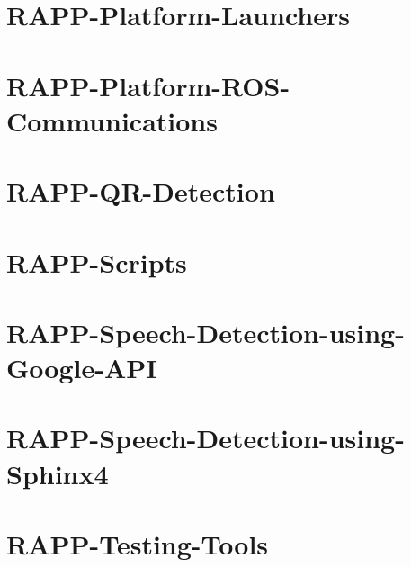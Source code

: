 \documentclass[twoside]{book}
\begin{document}
\chapter{R\-A\-P\-P-\/\-Platform-\/\-Launchers}
\label{md_rapp-platform_8wiki_RAPP-Platform-Launchers}
\hypertarget{md_rapp-platform_8wiki_RAPP-Platform-Launchers}{}

\chapter{R\-A\-P\-P-\/\-Platform-\/\-R\-O\-S-\/\-Communications}
\label{md_rapp-platform_8wiki_RAPP-Platform-ROS-Communications}
\hypertarget{md_rapp-platform_8wiki_RAPP-Platform-ROS-Communications}{}

\chapter{R\-A\-P\-P-\/\-Q\-R-\/\-Detection}
\label{md_rapp-platform_8wiki_RAPP-QR-Detection}
\hypertarget{md_rapp-platform_8wiki_RAPP-QR-Detection}{}

\chapter{R\-A\-P\-P-\/\-Scripts}
\label{md_rapp-platform_8wiki_RAPP-Scripts}
\hypertarget{md_rapp-platform_8wiki_RAPP-Scripts}{}

\chapter{R\-A\-P\-P-\/\-Speech-\/\-Detection-\/using-\/\-Google-\/\-A\-P\-I}
\label{md_rapp-platform_8wiki_RAPP-Speech-Detection-using-Google-API}
\hypertarget{md_rapp-platform_8wiki_RAPP-Speech-Detection-using-Google-API}{}

\chapter{R\-A\-P\-P-\/\-Speech-\/\-Detection-\/using-\/\-Sphinx4}
\label{md_rapp-platform_8wiki_RAPP-Speech-Detection-using-Sphinx4}
\hypertarget{md_rapp-platform_8wiki_RAPP-Speech-Detection-using-Sphinx4}{}

\chapter{R\-A\-P\-P-\/\-Testing-\/\-Tools}
\label{md_rapp-platform_8wiki_RAPP-Testing-Tools}
\hypertarget{md_rapp-platform_8wiki_RAPP-Testing-Tools}{}

\end{document}
